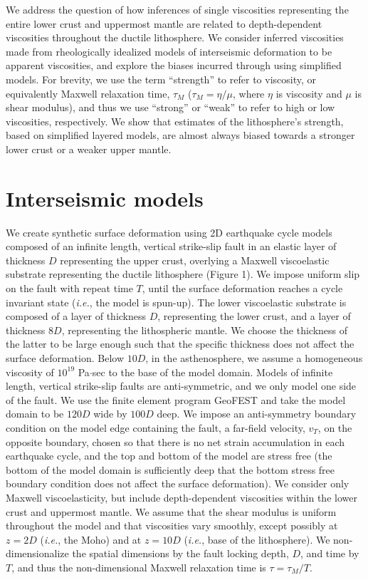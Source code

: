 We address the question of how inferences of single viscosities representing the entire lower crust and uppermost mantle are related to depth-dependent viscosities throughout the ductile lithosphere. We consider inferred viscosities made from rheologically idealized models of interseismic deformation to be apparent viscosities, and explore the biases incurred through using simplified models. For brevity, we use the term ``strength'' to refer to viscosity, or equivalently Maxwell relaxation time, $\tau_M$ ($\tau_M = \eta/\mu$, where $\eta$ is viscosity and $\mu$ is shear modulus), and thus we use ``strong'' or ``weak'' to refer to high or low viscosities, respectively. We show that estimates of the lithosphere's strength, based on simplified layered models, are almost always biased towards a stronger lower crust or a weaker upper mantle.

\section{Interseismic models}
We create synthetic surface deformation using 2D earthquake cycle models composed of an infinite length, vertical strike-slip fault in an elastic layer of thickness $D$ representing the upper crust, overlying a Maxwell viscoelastic substrate representing the ductile lithosphere (Figure 1). We impose uniform slip on the fault with repeat time $T$, until the surface deformation reaches a cycle invariant state ({\it i.e.}, the model is spun-up). The lower viscoelastic substrate is composed of a layer of thickness $D$, representing the lower crust, and a layer of thickness $8D$, representing the lithospheric mantle. We choose the thickness of the latter to be large enough such that the specific thickness does not affect the surface deformation.  Below $10D$, in the asthenosphere, we assume a homogeneous viscosity of $10^{19}$ Pa$\cdot$sec to the base of the model domain.  Models of infinite length, vertical strike-slip faults are anti-symmetric, and we only model one side of the fault. We use the finite element program GeoFEST \citep{Lyzenga2000} and take the model domain to be $120D$ wide by $100D$ deep. We impose an anti-symmetry boundary condition on the model edge containing the fault, a far-field velocity, $v_T$, on the opposite boundary, chosen so that there is no net strain accumulation in each earthquake cycle, and the top and bottom of the model are stress free (the bottom of the model domain is sufficiently deep that the bottom stress free boundary condition does not affect the surface deformation).  We consider only Maxwell viscoelasticity, but include depth-dependent viscosities within the lower crust and uppermost mantle. We assume that the shear modulus is uniform throughout the model and that viscosities vary smoothly, except possibly at $z = 2D$ ({\it i.e.}, the Moho) and at $z = 10D$ ({\it i.e.}, base of the lithosphere).  We non-dimensionalize the spatial dimensions by the fault locking depth, $D$, and time by $T$, and thus the non-dimensional Maxwell relaxation time is $\tau = \tau_M/T$. 

